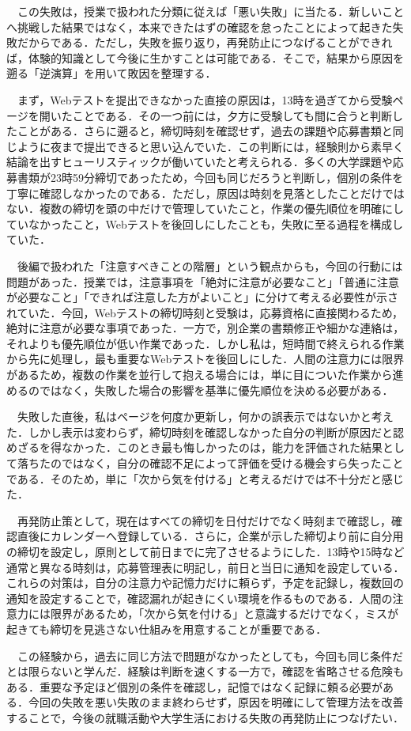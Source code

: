 \documentclass[titlepage,a4paper]{jsarticle}
\begin{document}
　この失敗は，授業で扱われた分類に従えば「悪い失敗」に当たる．新しいことへ挑戦した結果ではなく，本来できたはずの確認を怠ったことによって起きた失敗だからである．ただし，失敗を振り返り，再発防止につなげることができれば，体験的知識として今後に生かすことは可能である．そこで，結果から原因を遡る「逆演算」を用いて敗因を整理する．

　まず，Webテストを提出できなかった直接の原因は，13時を過ぎてから受験ページを開いたことである．その一つ前には，夕方に受験しても間に合うと判断したことがある．さらに遡ると，締切時刻を確認せず，過去の課題や応募書類と同じように夜まで提出できると思い込んでいた．この判断には，経験則から素早く結論を出すヒューリスティックが働いていたと考えられる．多くの大学課題や応募書類が23時59分締切であったため，今回も同じだろうと判断し，個別の条件を丁寧に確認しなかったのである．ただし，原因は時刻を見落としたことだけではない．複数の締切を頭の中だけで管理していたこと，作業の優先順位を明確にしていなかったこと，Webテストを後回しにしたことも，失敗に至る過程を構成していた．

　後編で扱われた「注意すべきことの階層」という観点からも，今回の行動には問題があった．授業では，注意事項を「絶対に注意が必要なこと」「普通に注意が必要なこと」「できれば注意した方がよいこと」に分けて考える必要性が示されていた．今回，Webテストの締切時刻と受験は，応募資格に直接関わるため，絶対に注意が必要な事項であった．一方で，別企業の書類修正や細かな連絡は，それよりも優先順位が低い作業であった．しかし私は，短時間で終えられる作業から先に処理し，最も重要なWebテストを後回しにした．人間の注意力には限界があるため，複数の作業を並行して抱える場合には，単に目についた作業から進めるのではなく，失敗した場合の影響を基準に優先順位を決める必要がある．

　失敗した直後，私はページを何度か更新し，何かの誤表示ではないかと考えた．しかし表示は変わらず，締切時刻を確認しなかった自分の判断が原因だと認めざるを得なかった．このとき最も悔しかったのは，能力を評価された結果として落ちたのではなく，自分の確認不足によって評価を受ける機会すら失ったことである．そのため，単に「次から気を付ける」と考えるだけでは不十分だと感じた．

　再発防止策として，現在はすべての締切を日付だけでなく時刻まで確認し，確認直後にカレンダーへ登録している．さらに，企業が示した締切より前に自分用の締切を設定し，原則として前日までに完了させるようにした．13時や15時など通常と異なる時刻は，応募管理表に明記し，前日と当日に通知を設定している．これらの対策は，自分の注意力や記憶力だけに頼らず，予定を記録し，複数回の通知を設定することで，確認漏れが起きにくい環境を作るものである．人間の注意力には限界があるため，「次から気を付ける」と意識するだけでなく，ミスが起きても締切を見逃さない仕組みを用意することが重要である．

　この経験から，過去に同じ方法で問題がなかったとしても，今回も同じ条件だとは限らないと学んだ．経験は判断を速くする一方で，確認を省略させる危険もある．重要な予定ほど個別の条件を確認し，記憶ではなく記録に頼る必要がある．今回の失敗を悪い失敗のまま終わらせず，原因を明確にして管理方法を改善することで，今後の就職活動や大学生活における失敗の再発防止につなげたい．
\end{document}

